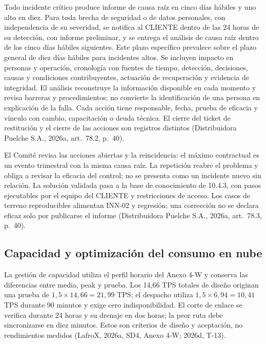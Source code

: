 Todo incidente crítico produce informe de causa raíz en cinco días hábiles y uno alto en diez. Para toda brecha de seguridad o de datos personales, con independencia de su severidad, se notifica al CLIENTE dentro de las 24 horas de su detección, con informe preliminar, y se entrega el análisis de causa raíz dentro de los cinco días hábiles siguientes. Este plazo específico prevalece sobre el plazo general de diez días hábiles para incidentes altos. Se incluyen impacto en personas y operación, cronología con fuentes de tiempo, detección, decisiones, causas y condiciones contribuyentes, actuación de recuperación y evidencia de integridad. El análisis reconstruye la información disponible en cada momento y revisa barreras y procedimientos; no convierte la identificación de una persona en explicación de la falla. Cada acción tiene responsable, fecha, prueba de eficacia y vínculo con cambio, capacitación o deuda técnica. El cierre del ticket de restitución y el cierre de las acciones son registros distintos (Distribuidora Puelche S.A., 2026a, art.~78.2, p.~40).

El Comité revisa las acciones abiertas y la reincidencia: el máximo contractual es un evento trimestral con la misma causa raíz. La repetición reabre el problema y obliga a revisar la eficacia del control; no se presenta como un incidente nuevo sin relación. La solución validada pasa a la base de conocimiento de 10.4.3, con pasos ejecutables por el equipo del CLIENTE y restricciones de acceso. Los casos de terreno reproducibles alimentan INN-02 y regresión; una corrección no se declara eficaz solo por publicarse el informe (Distribuidora Puelche S.A., 2026a, art.~78.3, p.~40).

\subsection{Capacidad y optimización del consumo en nube}
\label{subsec:sd11-consumo}

La gestión de capacidad utiliza el perfil horario del Anexo 4-W y conserva las diferencias entre media, peak y prueba. Los 14,66 TPS totales de diseño originan una prueba de $1,5\times14,66=21,99$ TPS; el despacho utiliza $1,5\times6,94=10,41$ TPS durante 90 minutos y exige cero indisponibilidad. El corte de enlace se verifica durante 24 horas y su drenaje en dos horas; la peor ruta debe sincronizarse en diez minutos. Estos son criterios de diseño y aceptación, no rendimientos medidos (LafroX, 2026a, SD4, Anexo 4-W; 2026d, T-13).

